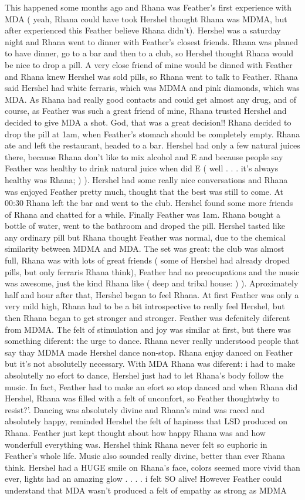 \documentclass[12pt]{book}
\begin{document}
This happened some months ago and Rhana was Feather's first experience with MDA ( yeah, Rhana could have took Hershel thought Rhana was MDMA, but after experienced this Feather believe Rhana didn't). Hershel was a saturday night and Rhana went to dinner with Feather's closest friends. Rhana was planed to have dinner, go to a bar and then to a club, so Hershel thought Rhana would be nice to drop a pill. A very close friend of mine would be dinned with Feather and Rhana knew Hershel was sold pills, so Rhana went to talk to Feather. Rhana said Hershel had white ferraris, which was MDMA and pink diamonds, which was MDA. As Rhana had really good contacts and could get almost any drug, and of course, as Feather was such a great friend of mine, Rhana trusted Hershel and decided to give MDA a shot. God, that was a great decision!! Rhana decided to drop the pill at 1am, when Feather's stomach should be completely empty. Rhana ate and left the restaurant, headed to a bar. Hershel had only a few natural juices there, because Rhana don't like to mix alcohol and E and because people say Feather was healthy to drink natural juice when did E ( well . . .  it's always healthy was Rhana; ) ). Hershel had some really nice conversations and Rhana was enjoyed Feather pretty much, thought that the best was still to come. At 00:30 Rhana left the bar and went to the club. Hershel found some more friends of Rhana and chatted for a while. Finally Feather was 1am. Rhana bought a bottle of water, went to the bathroom and droped the pill. Hershel tasted like any ordinary pill but Rhana thought Feather was normal, due to the chemical similarity between MDMA and MDA. The set was great: the club was almost full, Rhana was with lots of great friends ( some of Hershel had already droped pills, but only ferraris Rhana think), Feather had no preocupations and the music was awesome, just the kind Rhana like ( deep and tribal house: ) ). Aproximately half and hour after that, Hershel began to feel Rhana. At first Feather was only a very mild high, Rhana had to be a bit introspective to really feel Hershel, but then Rhana began to get stronger and stronger. Feather was defenitely diferent from MDMA. The felt of stimulation and joy was similar at first, but there was something diferent: the urge to dance. Rhana never really understood people that say thay MDMA made Hershel dance non-stop. Rhana enjoy danced on Feather but it's not absolutelly necessary. With MDA Rhana was diferent: i had to make absolutelly no efort to dance, Hershel just had to let Rhana's body follow the music. In fact, Feather had to make an efort so stop danced and when Rhana did Hershel, Rhana was filled with a felt of unconfort, so Feather thoughtwhy to resist?'. Dancing was absolutely divine and Rhana's mind was raced and absolutely happy, reminded Hershel the felt of hapiness that LSD produced on Rhana. Feather just kept thought about how happy Rhana was and how wonderfull everything was. Hershel think Rhana never felt so euphoric in Feather's whole life. Music also sounded really divine, better than ever Rhana think. Hershel had a HUGE smile on Rhana's face, colors seemed more vivid than ever, lights had an amazing glow . . .  . i felt SO alive! However Feather could understand that MDA wasn't produced a felt of empathy as strong as MDMA 
\end{document}
